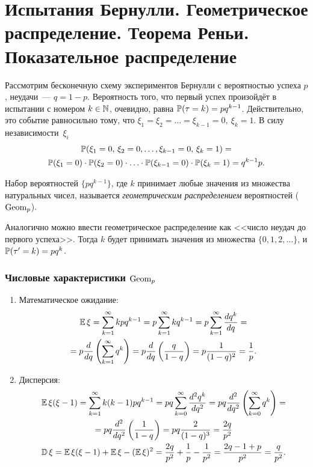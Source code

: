 \section{Испытания Бернулли. Геометрическое распределение. Теорема Реньи. Показательное распределение}
Рассмотрим бесконечную схему экспериментов Бернулли с вероятностью успеха $p$, неудачи~--- $q = 1 - p$. 
Вероятность того, что первый успех произойдёт в испытании с номером $k \in \mathbb{N}$, очевидно, равна $\operatorname{\mathbb{P}}(\tau = k) = pq^{k-1}$.
Действительно, это событие равносильно тому, что $\xi_1 = \xi_2 = \ldots = \xi_{k-1} = 0,\: \xi_k = 1$. 
В силу независимости~$\xi_i$
\begin{multline*}
    \operatorname{\mathbb{P}}(\xi_1 = 0,\, \xi_2 = 0, \ldots, \xi_{k-1} = 0,\, \xi_k = 1) = \\
    \operatorname{\mathbb{P}}(\xi_1 = 0) \cdot \operatorname{\mathbb{P}}(\xi_2 = 0) \cdot \ldots \cdot \operatorname{\mathbb{P}}(\xi_{k-1} = 0) \cdot \operatorname{\mathbb{P}}(\xi_k = 1) =
    q^{k-1}p.
\end{multline*}

\begin{defn}
    Набор вероятностей $\{p q^{k-1}\}$, где $k$ принимает любые значения из множества натуральных чисел, называется \textit{геометрическим распределением} вероятностей ($\operatorname{\mathrm{Geom}}_{p}$).
\end{defn}

Аналогично можно ввести геометрическое распределение как <<число неудач до первого успеха>>. 
Тогда $k$ будет принимать значения из множества $\{0, 1, 2, \ldots\}$, и $\operatorname{\mathbb{P}}(\tau^{\prime} = k) = pq^k$.

\subsubsection{Числовые характеристики $\operatorname{\mathrm{Geom}}_{p}$}
\begin{enumerate}
    \item Математическое ожидание:
    \begin{multline*}
        \operatorname{\mathbb{E}} \xi=\sum\limits_{k=1}^{\infty} k p q^{k-1}=p \sum\limits_{k=1}^{\infty} k q^{k-1}=p \sum\limits_{k=1}^{\infty} \frac{d q^{k}}{d q} = \\
        = p \frac{d}{d q}\left(\sum\limits_{k=1}^{\infty} q^{k}\right)=p \frac{d}{d q}\left(\frac{q}{1-q}\right)=p \frac{1}{(1-q)^{2}}=\frac{1}{p}.
    \end{multline*}
    \item Дисперсия:
    \begin{multline*}
        \operatorname{\mathbb{E}} \xi(\xi-1)=\sum\limits_{k=1}^{\infty} k(k-1) p q^{k-1}=p q \sum\limits_{k=0}^{\infty} \frac{d^{2} q^{k}}{d q^{2}} =p q \frac{d^{2}}{d q^{2}}\left(\sum\limits_{k=0}^{\infty} q^{k}\right) = \\
        =p q \frac{d^{2}}{d q^{2}}\left(\frac{1}{1-q}\right)=p q \frac{2}{(1-q)^{3}}=\frac{2 q}{p^{2}} \\
        \operatorname{\mathbb{D}} \xi=\operatorname{\mathbb{E}} \xi(\xi-1)+\operatorname{\mathbb{E}} \xi-(\operatorname{\mathbb{E}} \xi)^{2}=\frac{2 q}{p^{2}}+\frac{1}{p}-\frac{1}{p^{2}}=\frac{2 q-1+p}{p^{2}}=\frac{q}{p^{2}}.
    \end{multline*}
\end{enumerate}

